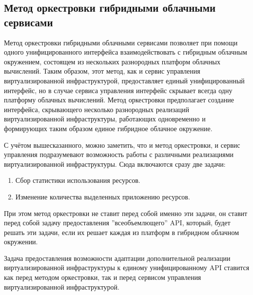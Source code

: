 \subsection{Метод оркестровки гибридными облачными сервисами}
Метод оркестровки гибридными облачными сервисами\cite{orchestrating-hybrid-cloud-services} позволяет при помощи одного унифицированного интерфейса взаимодействовать с гибридным облачным окружением, состоящем из нескольких разнородных платформ облачных вычислений.
Таким образом, этот метод, как и сервис управления виртуализированной инфраструктурой, предоставляет единый унифицированный интерфейс, но в случае сервиса управления интерфейс скрывает всегда одну платформу облачных вычислений.
Метод оркестровки предполагает создание интерфейса, скрывающего несколько разнородных реализаций виртуализированной инфраструктуры, работающих одновременно и формирующих таким образом единое гибридное облачное окружение.

С учётом вышесказанного, можно заметить, что и метод оркестровки, и сервис управления подразумевают возможность работы с различными реализациями виртуализированной инфраструктуры.
Сюда включаются сразу две задачи:
\begin{enumerate}
    \item Сбор статистики использования ресурсов.
    \item Изменение количества выделенных приложению ресурсов.
\end{enumerate}
При этом метод оркестровки не ставит перед собой именно эти задачи, он ставит перед собой задачу предоставления ''всеобъемлющего'' API, который, будет решать эти задачи, если их решает каждая из платформ в гибридном облачном окружении.

Задача предоставления возможности адаптации дополнительной реализации виртуализированной инфраструктуры к единому унифицированному API ставится как перед методом оркестровки, так и перед сервисом управления виртуализированной инфраструктурой.
